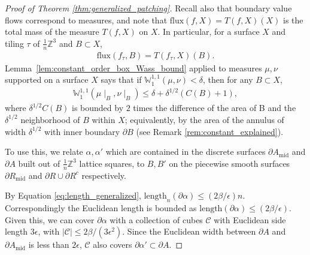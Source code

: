 \documentclass[10pt,a4paper]{amsart}
\newcommand{\m}[1]{\mathbb{#1}}
\newcommand{\mc}[1]{\mathcal{#1}}
\begin{document}
\begin{proof}[Proof of Theorem \ref{thm:generalized_patching}]
    Recall also that boundary value flows correspond to measures, and note that $\text{flux}(f,X) = T(f,X)(X)$ is the total mass of the measure $T(f,X)$ on $X$. In particular, for a surface $X$ and tiling $\tau$ of $\frac{1}{n}\m Z^3$ and $B\subset X$,
    \begin{align*}
        \text{flux}(f_\tau, B) = T(f_\tau,X)(B).
    \end{align*}
Lemma~\ref{lem:constant_order_box_Wass_bound} applied to measures $\mu,\nu$ supported on a surface $X$ says that if $\m W_1^{1,1}(\mu,\nu)<\delta$, then for any $B\subset X$,  
    \begin{align*}
        \m W_1^{1,1}(\mu\mid_B,\nu\mid_B) \leq \delta + \delta^{1/2} (C(B)+1),
    \end{align*}
    where $\delta^{1/2} C(B)$ is bounded by $2$ times the difference of the area of B and the $\delta^{1/2}$ neighborhood of $B$ within $X$; equivalently, by the area of the annulus of width $\delta^{1/2}$ with inner boundary $\partial B$ (see Remark \ref{rem:constant_explained}). 
    
To use this, we relate $\alpha,\alpha'$ which are contained in the discrete surfaces $\partial A_{\text{mid}}$ and $\partial A$ built out of $\frac{1}{n}\m Z^3$ lattice squares, to $B,B'$ on the piecewise smooth surfaces $\partial R_{\text{mid}}$ and $\partial R\cup\partial R^c$ respectively.

By Equation \eqref{eq:length_generalized}, $\text{length}_n(\partial \alpha) \leq (2\beta/\epsilon)n$. Correspondingly the Euclidean length is bounded as $\text{length}(\partial \alpha)\leq (2\beta/\epsilon)$. Given this, we can cover $\partial \alpha$ with a collection of cubes $\mc C$ with Euclidean side length $3\epsilon$, with $|\mc C|\leq 2\beta/(3\epsilon^2)$. Since the Euclidean width between $\partial A$ and $\partial A_{\text{mid}}$ is less than $2\epsilon$, $\mc C$ also covers $\partial \alpha'\subset \partial A$.


\end{proof}
\end{document}
